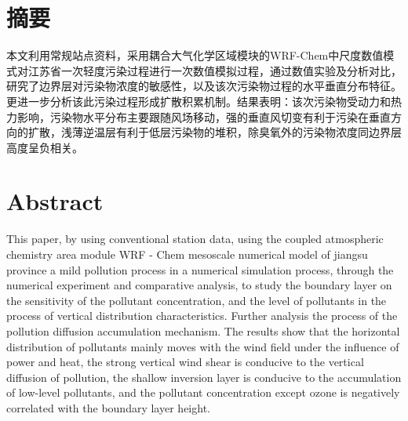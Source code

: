 \maketitle%
\MAKETITLE%
\makedeclaration%
\intobmk\chapter*{摘\quad 要}%
\setcounter{page}{1}%

本文利用常规站点资料，采用耦合大气化学区域模块的WRF-Chem中尺度数值模式对江苏省一次轻度污染过程进行一次数值模拟过程，通过数值实验及分析对比，研究了边界层对污染物浓度的敏感性，以及该次污染物过程的水平垂直分布特征。更进一步分析该此污染过程形成扩散积累机制。结果表明：该次污染物受动力和热力影响，污染物水平分布主要跟随风场移动，强的垂直风切变有利于污染在垂直方向的扩散，浅薄逆温层有利于低层污染物的堆积，除臭氧外的污染物浓度同边界层高度呈负相关。

\intobmk\chapter*{Abstract}%

This paper, by using conventional station data, using the coupled atmospheric chemistry area module WRF - Chem mesoscale numerical model of jiangsu province a mild pollution process in a numerical simulation process, through the numerical experiment and comparative analysis, to study the boundary layer on the sensitivity of the pollutant concentration, and the level of pollutants in the process of vertical distribution characteristics. Further analysis the process of the pollution diffusion accumulation mechanism. The results show that the horizontal distribution of pollutants mainly moves with the wind field under the influence of power and heat, the strong vertical wind shear is conducive to the vertical diffusion of pollution, the shallow inversion layer is conducive to the accumulation of low-level pollutants, and the pollutant concentration except ozone is negatively correlated with the boundary layer height.


